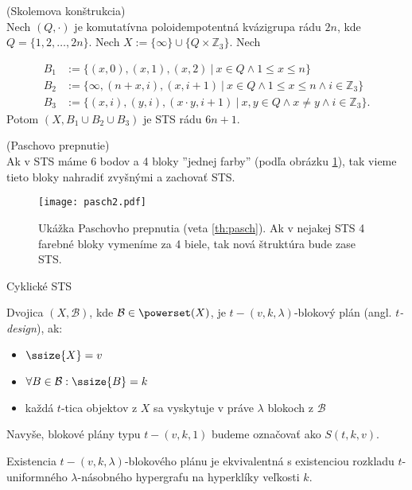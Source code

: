 \begin{theorem_hard}{(Skolemova konštrukcia)}\\
Nech $(Q, \cdot)$ je komutatívna poloidempotentná kvázigrupa rádu $2n$, kde $Q=\{1,2,\dots, 2n\}$. Nech $X:= \{\infty\}\cup\{Q\times \mathbb{Z}_3\}$. Nech

\begin{align*}
	B_1 &:= \{(x,0), (x,1), (x,2)~|~x\in Q\land 1\leq x \leq n\}\\
	B_2 &:= \{\infty, (n+x, i), (x, i+1)~|~ x\in Q\land 1\leq x\leq n\land i\in\mathbb{Z}_3\} \\
	B_3 &:= \{(x,i), (y,i), (x\cdot y, i+1)~|~ x,y\in Q\land x\neq y\land i\in\mathbb{Z}_3 \}.
\end{align*}
Potom $(X, B_1\cup B_2\cup B_3)$ je STS rádu $6n+1$.
\end{theorem_hard}

\begin{theorem_hard}{(Paschovo prepnutie)}\\
\label{th:pasch}
Ak v STS máme 6 bodov a 4 bloky ''jednej farby'' (podľa obrázku \ref{img:pasch}), tak vieme tieto bloky nahradiť zvyšnými a zachovať STS.
\end{theorem_hard}

\begin{figure}
    \centering
    \texttt{[image: pasch2.pdf]}
    \caption{Ukážka Paschovho prepnutia (veta \ref{th:pasch}). Ak v nejakej STS 4 farebné bloky vymeníme za 4 biele, tak nová štruktúra bude zase STS.}
    \label{img:pasch}
\end{figure}

\TODO Cyklické STS

\begin{definition}
Dvojica $(X, \mathcal{B})$, kde $\mathcal{B} \in \powerset(X)$, je $t-(v, k, \lambda)$-blokový plán (angl. \emph{$t$-design}), ak:
\begin{itemize}
    \item $\ssize{X} = v$
    \item $\forall B \in \mathcal{B}: \ssize{B} = k$
    \item každá $t$-tica objektov z $X$ sa vyskytuje v práve $\lambda$ blokoch z $\mathcal{B}$
\end{itemize}

Navyše, blokové plány typu $t-(v,k,1)$ budeme označovať ako $S(t,k,v)$.
\end{definition}

\begin{remark}
Existencia $t-(v,k,\lambda)$-blokového plánu je ekvivalentná s existenciou rozkladu $t$-uniformného $\lambda$-násobného hypergrafu na hyperklíky veľkosti $k$.
\end{remark}

